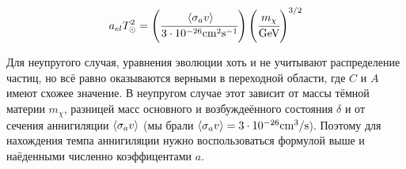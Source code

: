\begin{equation}
	a_{el}T_{\odot}^2 = 
	\left(\cfrac{   \left\langle \sigma_{a}v \right\rangle    }{3\cdot10^{-26} \text{cm}^2\text{s}^{-1}} \right)
	\left(\cfrac{m_{\chi}}{\text{GeV}}\right)^{3/2}
\end{equation}

Для неупругого случая, уравнения эволюции хоть и не учитывают распределение частиц, но всё равно оказываются верными в переходной области, где $C$ и $A$ имеют схожее значение. 
В неупругом случае этот зависит от массы тёмной материи $m_{\chi}$, разницей масс основного и возбуждеённого состояния $\delta$ и от сечения аннигиляции $\left\langle \sigma_{a}v \right\rangle$ (мы брали $\left\langle \sigma_{a}v \right\rangle = 3\cdot 10^{-26} \text{cm}^3/\text{s}$). Поэтому для нахождения темпа аннигиляции нужно воспользоваться формулой выше и наёденными численно коэффицентами $a$.
